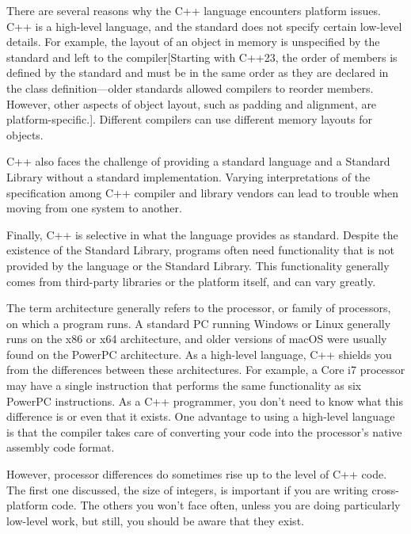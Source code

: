 
There are several reasons why the C++ language encounters platform issues. C++ is a high-level language, and the standard does not specify certain low-level details. For example, the layout of an object in memory is unspecified by the standard and left to the compiler[Starting with C++23, the order of members is defined by the standard and must be in the same order as they are declared in the class definition—older standards allowed compilers to reorder members. However, other aspects of object layout, such as padding and alignment, are platform-specific.]. Different compilers can use different memory layouts for objects.

C++ also faces the challenge of providing a standard language and a Standard Library without a standard implementation. Varying interpretations of the specification among C++ compiler and library vendors can lead to trouble when moving from one system to another.

Finally, C++ is selective in what the language provides as standard. Despite the existence of the Standard Library, programs often need functionality that is not provided by the language or the Standard Library. This functionality generally comes from third-party libraries or the platform itself, and can vary greatly.


The term architecture generally refers to the processor, or family of processors, on which a program runs. A standard PC running Windows or Linux generally runs on the x86 or x64 architecture, and older versions of macOS were usually found on the PowerPC architecture. As a high-level language, C++ shields you from the differences between these architectures. For example, a Core i7 processor may have a single instruction that performs the same functionality as six PowerPC instructions. As a C++ programmer, you don’t need to know what this difference is or even that it exists. One advantage to using a high-level language is that the compiler takes care of converting your code into the processor’s native assembly code format.

However, processor differences do sometimes rise up to the level of C++ code. The first one discussed, the size of integers, is important if you are writing cross-platform code. The others you won’t face often, unless you are doing particularly low-level work, but still, you should be aware that they exist.


